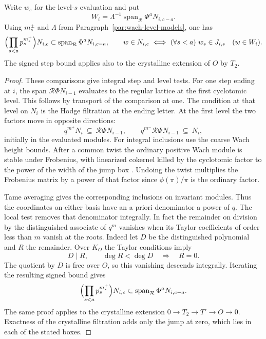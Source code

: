 \begin{proposition}\label{prop:wach-arc-membership}
Write \(w_s\) for the level-\(s\) evaluation and put
\[
 W_i=\Lambda^{-1}\operatorname{span}_{\mathcal R}\Phi^a N_{i,c-a}.
\]
Using \(m_s^\pm\) and \(\Lambda\) from
Paragraph~\ref{par:wach-level-models}, one has
\[
 \Bigl(\prod_{s<a}p_s^{m_s^+}\Bigr)N_{i,c}
    \subset\operatorname{span}_{\mathcal R}\Phi^aN_{i,c-a},
 \qquad
 w\in N_{i,c}\ \Longleftrightarrow\
 (\forall s<a)\ w_s\in J_{i,s}\quad(w\in W_i).
\]
The signed step bound applies also to the crystalline extension of
\(O\) by \(T_2\).
\end{proposition}

\begin{proof}
These comparisons give integral step and level tests. For
one step ending at \(i\), the span \(\mathcal R\Phi N_{i-1}\)
evaluates to the regular lattice at the first cyclotomic
level. This follows by transport of the comparison at one.
The condition at that level on \(N_i\) is the Hodge filtration
at the ending letter. At the first level the two factors move in opposite directions:
\[
 q^{m^+}N_i\ \subseteq\ \mathcal R\Phi N_{i-1},\qquad q^{m^-}\mathcal R\Phi N_{i-1}\ \subseteq\ N_i,
\]
initially in the evaluated modules. For integral inclusions use the coarse Wach height bounds.
After a common twist the ordinary positive Wach module is
stable under Frobenius, with linearized cokernel killed by
the cyclotomic factor to the power of the width of the
jump box \cite[Definition III.4.1 and Proposition III.4.2]{berger-wach}.
Undoing the twist multiplies the Frobenius matrix by a
power of that factor since \(\phi(\pi)/\pi\) is the ordinary
factor.

Tame averaging gives the corresponding inclusions
on invariant modules. Thus the coordinates on either basis
have an a priori denominator a power of \(q\). The
local test removes that denominator integrally. In fact the
remainder on division by the distinguished associate of
\(q^m\) vanishes when its Taylor coefficients of order
less than \(m\) vanish at the roots. Indeed let \(D\) be the distinguished polynomial and \(R\) the remainder. Over \(K_O\) the Taylor conditions imply
\[
 D\mid R,\qquad \deg R<\deg D\quad\Longrightarrow\quad R=0.
\]
The quotient by \(D\) is free over \(O\), so this vanishing descends integrally. Iterating the resulting signed bound gives
\[
 \Bigl(\prod_{s<a}p_s^{m_s^+}\Bigr)N_{i,c}
    \subset\operatorname{span}_{\mathcal R}\Phi^aN_{i,c-a}.
\]
The same proof applies to the crystalline extension
\(0\to T_2\to T'\to O\to0\). Exactness of the crystalline filtration
adds only the jump at zero, which lies in each of the stated boxes.


\end{proof}
